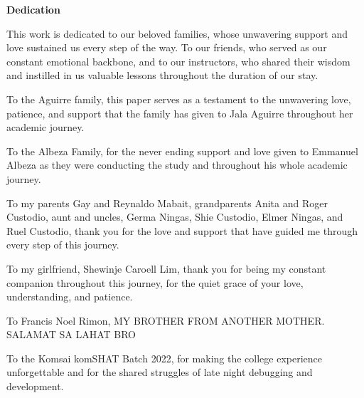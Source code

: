 \begin{center}
\textbf{Dedication}
\end{center}

This work is dedicated to our beloved families, whose unwavering support and love sustained us every step of the way. To our friends, who served as our constant emotional backbone, and to our instructors, who shared their wisdom and instilled in us valuable lessons throughout the duration of our stay.

To the Aguirre family, this paper serves as a testament to the unwavering love, patience, and support that the family has given to Jala Aguirre throughout her academic journey.

To the Albeza Family, for the never ending support and love given to Emmanuel Albeza as they were conducting the study and throughout his whole academic journey.

To my parents Gay and Reynaldo Mabait, grandparents Anita and Roger Custodio, aunt and uncles, Germa Ningas, Shie Custodio, Elmer Ningas, and Ruel Custodio, thank you for the love and support that have guided me through every step of this journey. 

To my girlfriend, Shewinje Caroell Lim, thank you for being my constant companion throughout this journey, for the quiet grace of your love, understanding, and patience. 

To Francis Noel Rimon, MY BROTHER FROM ANOTHER MOTHER. SALAMAT SA LAHAT BRO


To the Komsai komSHAT Batch 2022, for making the college experience unforgettable and for the shared struggles of late night debugging and development.

